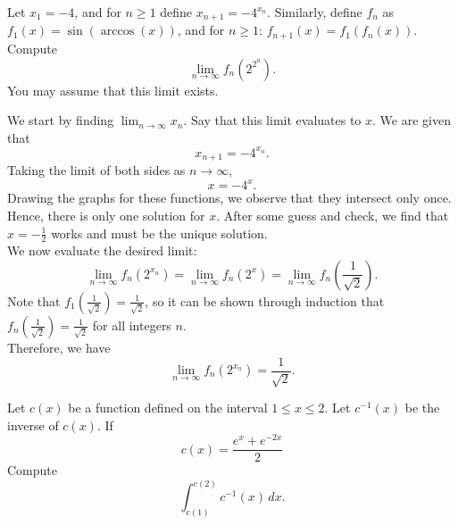 \documentclass[12pt]{article}
\newcounter{problem}
\begin{document}
\vspace{1cm}

\begin{problem}[D][6][BMT 2021/6]
   Let \(x_1 = -4\), and for \(n \geq 1\) define \(x_{n+1} = -4^{x_n}\). Similarly, define $f_n$ as \(f_1(x) = \sin(\arccos(x))\), and for \(n \geq 1\): \(f_{n+1}(x) = f_1(f_n(x))\). Compute 
    \[
    \lim_{n \to \infty} f_n(2^{2^n}).
    \]
    You may assume that this limit exists.
\end{problem}

\begin{solution}
   We start by finding \(\lim_{n \to \infty} x_n\). Say that this limit evaluates to \(x\). We are given that
\[
x_{n+1} = -4^{x_n}.
\]
Taking the limit of both sides as \(n \to \infty\),
\[
x = -4^x.
\]
Drawing the graphs for these functions, we observe that they intersect only once. Hence, there is only one solution for \(x\). After some guess and check, we find that \(x = -\frac{1}{2}\) works and must be the unique solution. \\[10pt]
We now evaluate the desired limit:
\[
\lim_{n \to \infty} f_n(2^{x_n}) = \lim_{n \to \infty} f_n(2^x) = \lim_{n \to \infty} f_n\left(\frac{1}{\sqrt{2}}\right).
\]
Note that \(f_1\left(\frac{1}{\sqrt{2}}\right) = \frac{1}{\sqrt{2}}\), so it can be shown through induction that \(f_n\left(\frac{1}{\sqrt{2}}\right) = \frac{1}{\sqrt{2}}\) for all integers \(n\). \\[10pt]
Therefore, we have
\[
\lim_{n \to \infty} f_n(2^{x_n}) = \boxed{\frac{1}{\sqrt{2}}}.
\]
\end{solution}

\vspace{1cm}

\begin{problem}[D][5][BMT 2021/7]
   Let \( c(x) \) be a function defined on the interval \(1 \leq x \leq 2\). Let \(c^{-1}(x)\) be the inverse of \(c(x)\). If
   \[c(x) = \frac{e^x + e^{-2x}}{2}\]
   Compute
   \[ \int_{c(1)}^{c(2)} c^{-1}(x) \, dx. \]
\end{problem}

\vspace{-1.2cm}
\end{document}
